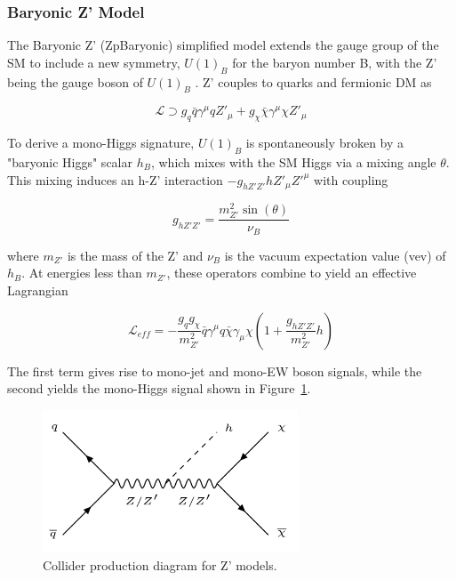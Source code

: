 \subsubsection{Baryonic Z' Model}

The Baryonic Z' (ZpBaryonic) simplified model extends the gauge group of the SM to include a new symmetry, $U(1)_B$ for the baryon number B, with the Z' being the gauge boson of $U(1)_B$ \cite{Carone:1994aa, Agashe:2004bm, FileviezPerez:2010gw}. Z' couples to quarks and fermionic DM as

\begin{equation}
\mathcal{L} \supset g_q \bar{q} \gamma^\mu q Z'_\mu + g_\chi \bar{\chi} \gamma^\mu \chi Z'_\mu
\end{equation}

To derive a mono-Higgs signature, $U(1)_B$ is spontaneously broken by a "baryonic Higgs" scalar $h_B$, which mixes with the SM Higgs via a mixing angle $\theta$. This mixing induces an h-Z' interaction $-g_{hZ'Z'} h Z'_\mu Z'^\mu$ with coupling

\begin{equation}
g_{hZ'Z'} = \frac{m_{Z'}^2 \sin(\theta)}{\nu_B}
\end{equation}

where $m_{Z'}$ is the mass of the Z' and $\nu_B$ is the vacuum expectation value (vev) of $h_B$. At energies less than $m_{Z'}$, these operators combine to yield an effective Lagrangian

\begin{equation}
\mathcal{L}_{eff} = -\frac{g_q g_\chi}{m_{Z'}^2} \bar{q} \gamma^\mu q \bar{\chi} \gamma_\mu \chi (1 + \frac{g_{hZ'Z'}}{m_{Z'}^2} h)
\end{equation}

The first term gives rise to mono-jet and mono-EW boson signals, while the second yields the mono-Higgs signal shown in Figure~\ref{fig:zpsig}.

\begin{figure}[tbh]
\centering
\includegraphics[width=3in]{figures/zpsig.png}
\caption{Collider production diagram for Z' models.}
\label{fig:zpsig}
\end{figure}

